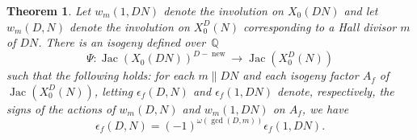 \documentclass[11pt,reqno]{amsart}
\newcommand{\Q}{\mathbb{Q}}
\newcommand{\Jac}{\operatorname{Jac}}
\newcommand{\new}{\operatorname{new}}
\newtheorem{theorem}{Theorem}[section]
\theoremstyle{definition}
\newcommand{\Pietro}[1]{{\color{orange}{??Pietro: #1}}} %
\newcommand{\freddy}[1]{{\color{purple}{$\spadesuit$ Freddy: #1}}}
\begin{document}
\begin{theorem}\cite{Ribet80, BD96, HPS89a, HPS89b}\label{Ribet_isog}
Let $w_m(1,DN)$ denote the involution on $X_0(DN)$ and let $w_m(D,N)$ denote the involution on $X_0^D(N)$ corresponding to a Hall divisor $m$ of $DN$. There is an isogeny defined over~$\Q$
\[
\Psi \colon \Jac(X_0(DN))^{D-\new} \longrightarrow \Jac(X_0^D(N))
\]
such that the following holds: for each $m \parallel DN$ and each isogeny factor $A_f$ of $\Jac(X_0^D(N))$, letting $\epsilon_f(D,N)$ and $\epsilon_f(1,DN)$ denote, respectively, the signs of the actions of $w_m(D,N)$ and $w_m(1,DN)$ on $A_f$, we have 
\begin{equation}\label{eqn: AL_action_Ribet}
   \epsilon_f(D,N) = (-1)^{\omega(\gcd(D,m))} \epsilon_f(1,DN).
\end{equation} 
\end{theorem}
\end{document}
